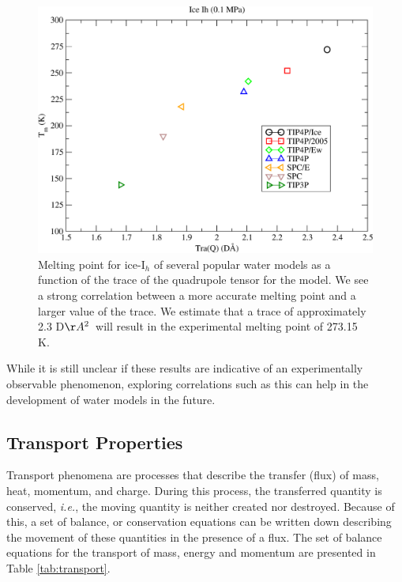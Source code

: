 \begin{figure}
\includegraphics[width = \linewidth]{Figures/Tm_Ih_TraQ_plot.pdf}
\caption{\label{fig:TraQ} Melting point for ice-I$_h$ of several popular water models as a function of the trace of the quadrupole tensor for the model. We see a strong correlation between a more accurate melting point and a larger value of the trace. We estimate that a trace of approximately 2.3 D$\AA^{2}$~will result in the experimental melting point of 273.15 K.}
\end{figure}

While it is still unclear if these results are indicative of an
experimentally observable phenomenon, exploring correlations such as
this can help in the development of water models in the future. 


\subsection{Transport Properties}
Transport phenomena are processes that describe the transfer (flux) of
mass, heat, momentum, and charge. During this
process, the transferred quantity is conserved, \textit{i.e.}, the
moving quantity is neither created nor destroyed. Because of this, a set
of balance, or conservation equations can be written down describing
the movement of these quantities in the presence of a flux. The set of
balance equations for the transport of mass, energy and momentum are
presented in Table \ref{tab:transport}. 


